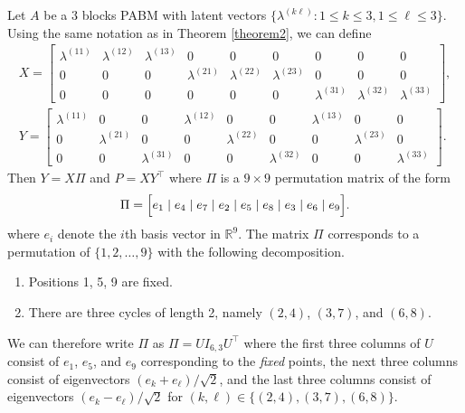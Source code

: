 \documentclass[12pt]{article}
\begin{document}
\begin{example} Let $A$ be a $3$ blocks PABM with latent vectors
  $\{\lambda^{(k \ell)} \colon 1 \leq k \leq 3, 1 \leq \ell \leq 3\}$. Using the same notation as in Theorem
  \ref{theorem2}, we can define
\begin{gather*}
X = \begin{bmatrix}
\lambda^{(11)} & \lambda^{(12)} & \lambda^{(13)} & 0 & 0 & 0 & 0 & 0 & 0 \\
0 & 0 & 0 & \lambda^{(21)} & \lambda^{(22)} & \lambda^{(23)} & 0 & 0 & 0 \\
0 & 0 & 0 & 0 & 0 & 0 & \lambda^{(31)} & \lambda^{(32)} & \lambda^{(33)}
\end{bmatrix}, \\
Y = \begin{bmatrix}
\lambda^{(11)} & 0 & 0 & \lambda^{(12)} & 0 & 0 & \lambda^{(13)} & 0 & 0 \\
0 & \lambda^{(21)} & 0 & 0 & \lambda^{(22)} & 0 & 0 & \lambda^{(23)} & 0 \\
0 & 0 & \lambda^{(31)} & 0 & 0 & \lambda^{(32)} & 0 & 0 & \lambda^{(33)}
\end{bmatrix}.
\end{gather*}
Then $Y = X \Pi$ and $P = X Y^{\top}$ where $\Pi$ is a $9 \times 9$ permutation matrix of
the form
$$\Pi = %
\Bigl[e_1 \mid e_4 \mid e_7 \mid e_2 \mid e_5 \mid e_8 \mid e_3
\mid e_6 \mid e_9 \Bigr].
$$
where $e_i$ denote the $i$th basis vector in $\mathbb{R}^{9}$. 
The matrix $\Pi$ corresponds to a permutation of $\{1,2,\dots,9\}$
with the following decomposition.
\begin{enumerate}
\item Positions 1, 5, 9 are fixed.
\item There are three cycles of length 2, namely $(2, 4)$, $(3, 7)$, and $(6, 8)$.
\end{enumerate}
We can therefore write $\Pi$ as $\Pi = U I_{6, 3} U^\top$ where the first three
columns of $U$ consist of $e_1$, $e_5$, and $e_9$ corresponding to the
{\em fixed} points, the next three columns consist of eigenvectors
$(e_k + e_{\ell}) / \sqrt{2}$, and the last three columns consist of eigenvectors
$(e_k - e_{\ell}) / \sqrt{2}$ for $(k, \ell) \in
\{(2,4),(3,7),(6,8)\}$.


\end{example}
\end{document}
